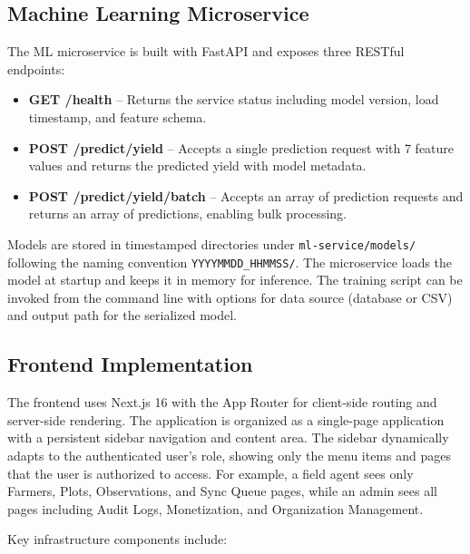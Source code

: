 \documentclass[12pt,a4paper,oneside]{report}
\begin{document}
\subsection{Machine Learning Microservice}
The ML microservice is built with FastAPI \cite{fastapi2025} and exposes three RESTful endpoints:

\begin{itemize}
  \item \textbf{GET /health} -- Returns the service status including model version, load timestamp, and feature schema.
  \item \textbf{POST /predict/yield} -- Accepts a single prediction request with 7 feature values and returns the predicted yield with model metadata.
  \item \textbf{POST /predict/yield/batch} -- Accepts an array of prediction requests and returns an array of predictions, enabling bulk processing.
\end{itemize}

Models are stored in timestamped directories under \texttt{ml-service/models/} following the naming convention \texttt{YYYYMMDD\_HHMMSS/}. The microservice loads the model at startup and keeps it in memory for inference. The training script can be invoked from the command line with options for data source (database or CSV) and output path for the serialized model.

\subsection{Frontend Implementation}
The frontend uses Next.js 16 \cite{nextjs2025} with the App Router for client-side routing and server-side rendering. The application is organized as a single-page application with a persistent sidebar navigation and content area. The sidebar dynamically adapts to the authenticated user's role, showing only the menu items and pages that the user is authorized to access. For example, a field agent sees only Farmers, Plots, Observations, and Sync Queue pages, while an admin sees all pages including Audit Logs, Monetization, and Organization Management.

Key infrastructure components include:
\end{document}
